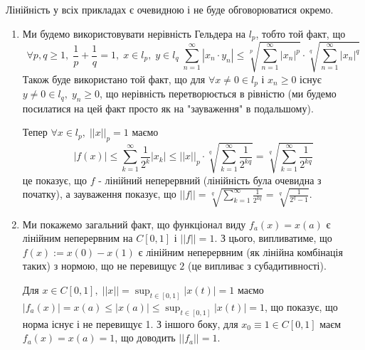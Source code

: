 \documentclass[12pt]{article} %
\newcommand{\mynorm}[1]{\left|\left|#1\right|\right|}
\newcommand{\myabs}[1]{\left|#1\right|}
\begin{document}
	Лінійність у всіх прикладах є очевидною і не буде обговорюватися окремо.
	\begin{enumerate}
		\item{Ми будемо використовувати нерівність Гельдера на $l_p$, тобто той факт, що
			\[\forall p,q\geq 1,\;\frac{1}{p}+\frac{1}{q}=1,\;x\in l_p,\;y\in l_q\;\sum_{n=1}^\infty
			\myabs{x_n\cdot y_n}\leq 
			\sqrt[p]{\sum_{n=1}^\infty \myabs{x_n}^p}
			\cdot
			\sqrt[q]{\sum_{n=1}^\infty \myabs{x_n}^q}
			\]
			Також буде використано той факт, що для $\forall x\neq 0\in l_p$
			і $x_n\geq 0$ існує $y\neq 0\in l_q,\;y_n\geq 0$, що нерівність перетворюється
			в рівністю (ми будемо посилатися на цей факт просто як на "зауваження" в подальшому).

			Тепер $\forall x\in l_p,\;\mynorm{x}_p=1$ маємо \[\myabs{f(x)}\leq
			\sum_{k=1}^\infty\frac{1}{2^k}\myabs{x_k}\leq \mynorm{x}_p\cdot
			\sqrt[q]{\sum_{k=1}^\infty \frac{1}{2^{kq}}}=
			\sqrt[q]{\sum_{k=1}^\infty \frac{1}{2^{kq}}}
			\]
			це показує, що $f$ - лінійний неперервний (лінійність була очевидна з початку), а зауваження
			показує, що $\mynorm{f}=
			\sqrt[q]{\sum_{k=1}^\infty \frac{1}{2^{kq}}}=\sqrt[q]{\frac{1}{2^q-1}}$.
			}
		\item{Ми покажемо загальний факт, що функціонал виду $f_a(x)=x(a)$ є лінійним неперервним на $C[0,1]$ і $\mynorm{f}=1$.
			З цього, випливатиме, що $f(x):=x(0)-x(1)$ є лінійним неперервним (як лінійна комбінація таких) з нормою,
			що не перевищує $2$ (це випливає з субадитивності).

			Для $x\in C[0,1],\;\mynorm{x}=\sup_{t\in[0,1]}\myabs{x(t)}=1$ маємо $\myabs{f_a(x)}=x(a)\leq\myabs{x(a)}\leq
			\sup_{t\in[0,1]}\myabs{x(t)}=1$, що показує, що норма існує і не перевищує 1. З іншого боку, для $x_0\equiv 1\in C[0,1]$
			маєм $f_a(x)=x(a)=1$, що доводить $\mynorm{f_a}=1$.

}
\end{enumerate}
\end{document}
